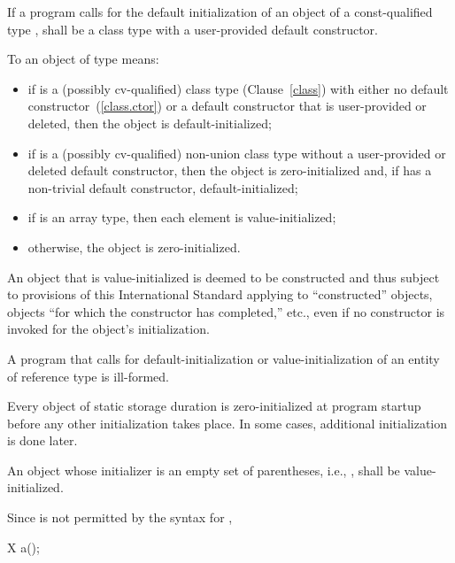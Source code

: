If a program calls for the default initialization of an object of a
const-qualified type ,  shall be a class type with a user-provided default constructor.

\pnum
{}%
To
an object of type
means:

\begin{itemize}
\item
if
is a (possibly cv-qualified) class type (Clause~\ref{class}) with
either no default constructor~(\ref{class.ctor}) or a default
constructor that is user-provided or deleted, then the object is default-initialized;

\item
if
is a (possibly cv-qualified) non-union class type without a
user-provided or deleted default constructor,
then the object is zero-initialized and, if  has a
non-trivial default constructor, default-initialized;

\item
if
is an array type, then each element is value-initialized;

\item
otherwise, the object is zero-initialized.
\end{itemize}

An object that is value-initialized is deemed to be constructed and thus subject to
provisions of this International Standard applying to ``constructed'' objects, objects
``for which the constructor has completed,'' etc., even if no constructor is invoked
for the object's initialization.

\pnum
A program that calls for default-initialization
or value-initialization
of an entity
of reference type is ill-formed.

\pnum
\enternote Every
object of static storage duration is
zero-initialized at program startup before any other initialization
takes place.
In some cases, additional initialization is done later.
\exitnote

\pnum
An object whose initializer is an empty set of parentheses, i.e.,
\tcode{()},
shall be
value-initialized.

%
\enternote
Since
\tcode{()}
is not permitted by the syntax for
,

\begin{codeblock}
X a();
\end{codeblock}

